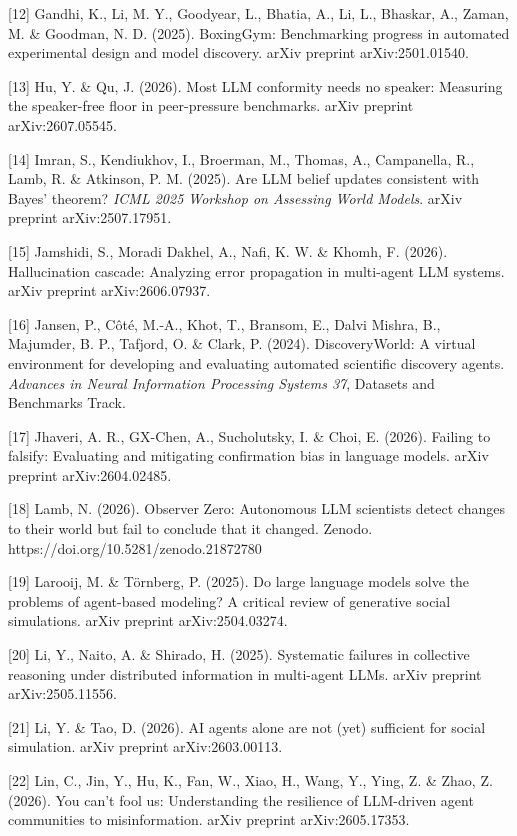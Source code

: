 \documentclass[pdflatex,sn-basic]{sn-jnl}
\begin{document}
{[}12{]} Gandhi, K., Li, M. Y., Goodyear, L., Bhatia, A., Li, L., Bhaskar, A., Zaman, M. \& Goodman, N. D. (2025). BoxingGym: Benchmarking progress in automated experimental design and model discovery. arXiv preprint arXiv:2501.01540.

{[}13{]} Hu, Y. \& Qu, J. (2026). Most LLM conformity needs no speaker: Measuring the speaker-free floor in peer-pressure benchmarks. arXiv preprint arXiv:2607.05545.

{[}14{]} Imran, S., Kendiukhov, I., Broerman, M., Thomas, A., Campanella, R., Lamb, R. \& Atkinson, P. M. (2025). Are LLM belief updates consistent with Bayes' theorem? \emph{ICML 2025 Workshop on Assessing World Models}. arXiv preprint arXiv:2507.17951.

{[}15{]} Jamshidi, S., Moradi Dakhel, A., Nafi, K. W. \& Khomh, F. (2026). Hallucination cascade: Analyzing error propagation in multi-agent LLM systems. arXiv preprint arXiv:2606.07937.

{[}16{]} Jansen, P., Côté, M.-A., Khot, T., Bransom, E., Dalvi Mishra, B., Majumder, B. P., Tafjord, O. \& Clark, P. (2024). DiscoveryWorld: A virtual environment for developing and evaluating automated scientific discovery agents. \emph{Advances in Neural Information Processing Systems 37}, Datasets and Benchmarks Track.

{[}17{]} Jhaveri, A. R., GX-Chen, A., Sucholutsky, I. \& Choi, E. (2026). Failing to falsify: Evaluating and mitigating confirmation bias in language models. arXiv preprint arXiv:2604.02485.

{[}18{]} Lamb, N. (2026). Observer Zero: Autonomous LLM scientists detect changes to their world but fail to conclude that it changed. Zenodo. https://doi.org/10.5281/zenodo.21872780

{[}19{]} Larooij, M. \& Törnberg, P. (2025). Do large language models solve the problems of agent-based modeling? A critical review of generative social simulations. arXiv preprint arXiv:2504.03274.

{[}20{]} Li, Y., Naito, A. \& Shirado, H. (2025). Systematic failures in collective reasoning under distributed information in multi-agent LLMs. arXiv preprint arXiv:2505.11556.

{[}21{]} Li, Y. \& Tao, D. (2026). AI agents alone are not (yet) sufficient for social simulation. arXiv preprint arXiv:2603.00113.

{[}22{]} Lin, C., Jin, Y., Hu, K., Fan, W., Xiao, H., Wang, Y., Ying, Z. \& Zhao, Z. (2026). You can't fool us: Understanding the resilience of LLM-driven agent communities to misinformation. arXiv preprint arXiv:2605.17353.
\end{document}
